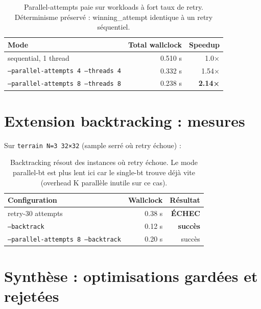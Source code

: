 \begin{table}[H]
\centering
\begin{tabular}{lrr}
\toprule
\textbf{Mode} & \textbf{Total wallclock} & \textbf{Speedup} \\
\midrule
sequential, 1 thread & 0.510 s & 1.0× \\
\texttt{--parallel-attempts 4 --threads 4} & 0.332 s & 1.54× \\
\texttt{--parallel-attempts 8 --threads 8} & 0.238 s & \textbf{2.14×} \\
\bottomrule
\end{tabular}
\caption{Parallel-attempts paie sur workloads à fort taux de retry. Déterminisme préservé : winning\_attempt identique à un retry séquentiel.}
\label{tab:res:parallel_attempts}
\end{table}

\section{Extension backtracking : mesures}
\label{sec:res:backtrack}

Sur \texttt{terrain N=3 32×32} (sample serré où retry échoue) :

\begin{table}[H]
\centering
\begin{tabular}{lrr}
\toprule
\textbf{Configuration} & \textbf{Wallclock} & \textbf{Résultat} \\
\midrule
retry-30 attempts & 0.38 s & \textbf{ÉCHEC} \\
\texttt{--backtrack} & 0.12 s & \textbf{succès} \\
\texttt{--parallel-attempts 8 --backtrack} & 0.20 s & succès \\
\bottomrule
\end{tabular}
\caption{Backtracking résout des instances où retry échoue. Le mode parallel-bt est plus lent ici car le single-bt trouve déjà vite (overhead K parallèle inutile sur ce cas).}
\label{tab:res:backtrack}
\end{table}

\section{Synthèse : optimisations gardées et rejetées}
\label{sec:res:synthesis}

